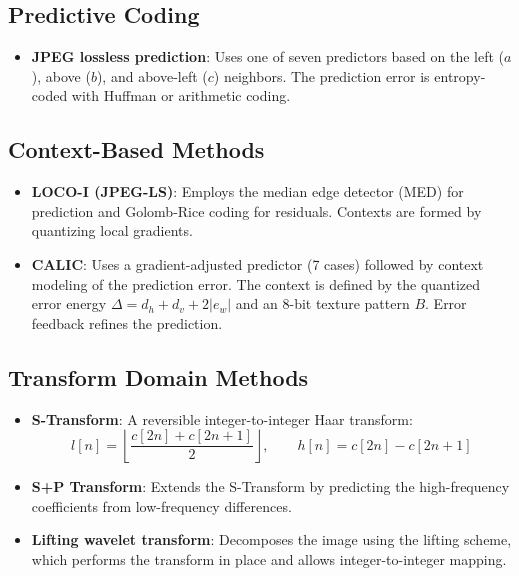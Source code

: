 \subsection{Predictive Coding}

\begin{itemize}
    \item \textbf{JPEG lossless prediction}: Uses one of seven predictors based on the left (\(a\)), above (\(b\)), and above-left (\(c\)) neighbors. The prediction error is entropy-coded with Huffman or arithmetic coding.
\end{itemize}

\subsection{Context-Based Methods}

\begin{itemize}
    \item \textbf{LOCO-I (JPEG-LS)}: Employs the median edge detector (MED) for prediction and Golomb-Rice coding for residuals. Contexts are formed by quantizing local gradients.
    
    \item \textbf{CALIC}: Uses a gradient-adjusted predictor (7 cases) followed by context modeling of the prediction error. The context is defined by the quantized error energy \(\Delta = d_h + d_v + 2|e_w|\) and an 8-bit texture pattern \(B\). Error feedback refines the prediction.
\end{itemize}

\subsection{Transform Domain Methods}

\begin{itemize}
    \item \textbf{S-Transform}: A reversible integer-to-integer Haar transform:
    \[
    l[n] = \left\lfloor\frac{c[2n] + c[2n+1]}{2}\right\rfloor, \qquad h[n] = c[2n] - c[2n+1]
    \]
    
    \item \textbf{S+P Transform}: Extends the S-Transform by predicting the high-frequency coefficients from low-frequency differences.
    
    \item \textbf{Lifting wavelet transform}: Decomposes the image using the lifting scheme, which performs the transform in place and allows integer-to-integer mapping.
\end{itemize}


